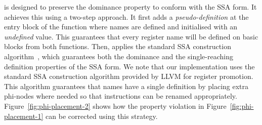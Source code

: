 



{\ProjName} is designed to preserve the dominance property to conform with the SSA form.
It achieves this using a two-step approach.
It first adds a \textit{pseudo-definition} at the entry block of the function where names are defined and initialised with an
\textit{undefined} value.
This guarantees that every register name will be defined on basic blocks from both functions.
Then, {\ProjName} applies the standard SSA construction algorithm~\cite{cytron89,cytron91}, which guarantees both the dominance and the
single-reaching definition properties of the SSA form.
We note that our implementation uses the standard SSA construction algorithm provided by LLVM for register promotion.
This algorithm guarantees that names have a single definition by placing extra phi-nodes where needed so that instructions can be renamed appropriately.
Figure~\ref{fig:phi-placement-2} shows how the property violation in Figure~\ref{fig:phi-placement-1} can be corrected using this strategy.



